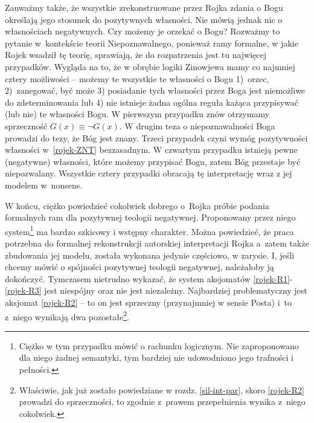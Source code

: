 Zauważmy także, że wszystkie zrekonstruowane przez Rojka zdania o Bogu określają jego stosunek
do pozytywnych własności. Nie mówią jednak nic o własnościach negatywnych.
Czy możemy je orzekać o Bogu? Rozważmy to pytanie w~kontekście teorii Niepoznawalnego,
ponieważ ramy formalne, w jakie Rojek wsadził tę teorię, sprawiają, że do rozpatrzenia jest
tu najwięcej przypadków. Wygląda na to, że w obrębie logiki Zinowjewa mamy co najmniej
cztery możliwości – możemy te wszystkie te własności o Bogu 1)~orzec, 2)~zanegować,
być może 3) posiadanie tych własności przez Boga jest niemożliwe do zdeterminowania lub
4) nie istnieje żadna ogólna reguła każąca przypisywać (lub nie) te własności Bogu.
W pierwszym przypadku znów otrzymamy sprzeczność $G(x) \equiv \neg G(x)$. W drugim teza o niepoznawalności
Boga prowadzi do tezy, że Bóg jest znany. Trzeci przypadek czyni wymóg pozytywności własności
w~\ref{rojek-ZNT} bezzasadnym. W czwartym przypadku istnieją pewne (negatywne) własności, które możemy przypisać Bogu, zatem Bóg przestaje być niepozwalany. Wszystkie cztery przypadki obracają tę interpretację
wraz z jej modelem w~nonsens.



W końcu, ciężko powiedzieć cokolwiek dobrego o~Rojka próbie podania formalnych ram
dla pozytywnej teologii negatywnej. Proponowany przez niego system\footnote{Ciężko w
tym przypadku mówić o rachunku logicznym. Nie zaproponowano dla niego
żadnej semantyki, tym bardziej nie udowodniono jego trafności i
pełności.} 
ma bardzo szkicowy i wstępny charakter.
Można powiedzieć, że praca potrzebna do formalnej rekonstrukcji autorskiej interpretacji Rojka
a~zatem także zbudowania jej modelu, została wykonana
jedynie częściowo, w zarysie. I, jeśli chcemy mówić o spójności
pozytywnej teologii negatywnej, należałoby ją dokończyć.
Tymczasem nietrudno wykazać, że system aksjomatów
\eqref{rojek-R1}-\eqref{rojek-R3} jest niespójny oraz nie jest niezależny.
Najbardziej problematyczny jest aksjomat \eqref{rojek-R2} -- to on jest sprzeczny (przynajmniej w sensie Posta)
i~to z~niego wynikają dwa pozostałe\footnote{Właściwie, jak już zostało powiedziane w rozdz. \ref{sil-int-par}, skoro \eqref{rojek-R2} prowadzi do sprzeczności, to zgodnie z~prawem przepełnienia wynika z~niego cokolwiek.}.



